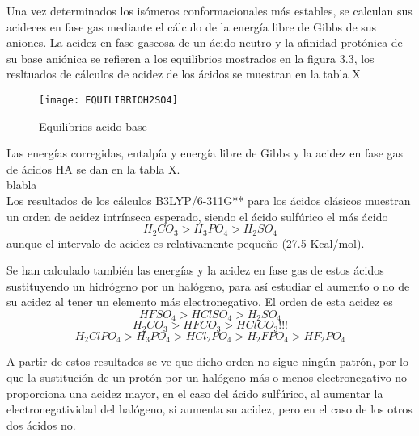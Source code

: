 Una vez determinados los isómeros conformacionales más estables, se calculan sus acideces en fase gas mediante el cálculo de la energía libre de Gibbs de sus aniones.
La acidez en fase gaseosa de un ácido neutro y la afinidad protónica de su base aniónica se refieren a los equilibrios mostrados en la figura 3.3, los resltuados de cálculos de acidez de los ácidos se muestran en la tabla X
    \begin{figure}[h]
        \centering
        \texttt{[image: EQUILIBRIOH2SO4]}
        \caption{Equilibrios acido-base}
    \end{figure}

  

    
 
Las energías corregidas, entalpía y energía libre de Gibbs y la acidez en fase gas de ácidos HA se dan en la tabla X. \\
blabla \\

Los resultados de los cálculos B3LYP/6-311G** para los ácidos clásicos muestran un orden de acidez intrínseca esperado, siendo el ácido sulfúrico el más ácido
$$H_{2}CO_{3}>H_{3}PO_{4}>H_{2}SO_{4}$$ aunque el intervalo de acidez es relativamente pequeño (27.5 Kcal/mol).

Se han calculado también las energías y la acidez en fase gas de estos ácidos sustituyendo un hidrógeno por un halógeno, para así estudiar el aumento o no de su acidez al tener un elemento más electronegativo. El orden de esta acidez es $$ HFSO_{4} > HClSO_{4} > H_{2}SO_{4}$$ $$H_{2}CO_{3} > HFCO_{3} > HClCO_{3} !!!$$ $$ H_{2}ClPO_{4} > H_{3}PO_{4} > HCl_{2}PO_{4} > H_{2}FPO_{4} > HF_{2}PO_{4} $$

A partir de estos resultados se ve que dicho orden no sigue ningún patrón, por lo que la sustitución de un protón por un halógeno más o menos electronegativo no proporciona una acidez mayor, en el caso del ácido sulfúrico, al aumentar la electronegatividad del halógeno, si aumenta su acidez, pero en el caso de los otros dos ácidos no.


